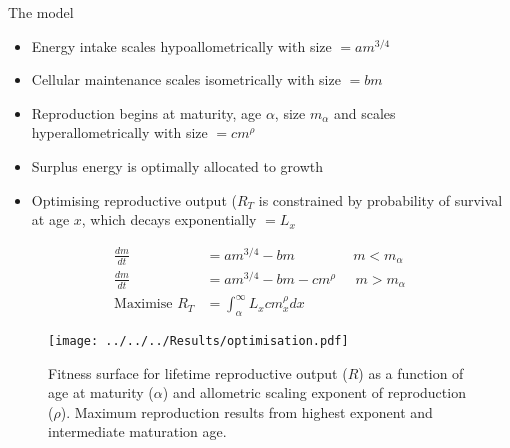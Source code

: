 \documentclass[xcolor={table}]{beamer}
\begin{document}
\begin{frame}[fragile=singleslide,t]
\begin{columns}[onlytextwidth,T]
\begin{column}{.47\textwidth}
\begin{block}{The model}
    \begin{itemize}
        \item Energy intake scales hypoallometrically with size $= am^{3/4}$%
        \item Cellular maintenance scales isometrically with size $= bm$ 
        \item Reproduction begins at maturity, age $\alpha$, size $m_{\alpha}$ and scales hyperallometrically with size $= cm^{\rho}$
        \item Surplus energy is optimally allocated to growth
        \item Optimising reproductive output ($R_{T}$ is constrained by probability of survival at age $x$, which decays exponentially $= L_x$
    \end{itemize}
    \begin{align*}
        \frac{dm}{dt} &= am^{3/4} - bm \; \; \; \; \; \; \; \; \; \; \; \; \; \; \; m < m_{\alpha} \\
        \frac{dm}{dt} &= am^{3/4} - bm - cm^{\rho} \; \; \; \;\; m > m_{\alpha} \\
        \text{Maximise } R_{T} &= \int_{\alpha}^{\infty} L_{x}cm_{x}^{\rho}dx
    \end{align*}
\end{block}

\begin{figure}
\texttt{[image: ../../../Results/optimisation.pdf]}
\caption{Fitness surface for lifetime reproductive output ($R$) as a function of age at maturity ($\alpha$) and allometric scaling exponent of reproduction ($\rho$). Maximum reproduction results from highest exponent and intermediate maturation age.}
\end{figure}



\end{column}
\end{columns}
\end{frame}
\end{document}
